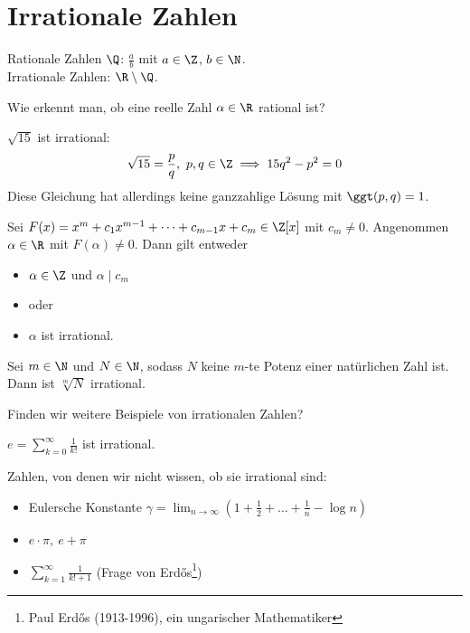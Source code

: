 \chapter{Irrationale Zahlen}

Rationale Zahlen $\Q$: $\frac{a}{b}$ mit $a \in \Z$, $b \in \N$.\\
Irrationale Zahlen: $\R \setminus \Q$.

\begin{frage*}
	Wie erkennt man, ob eine reelle Zahl $\alpha \in \R$ rational ist?
\end{frage*}

\begin{exmp*}
	$\sqrt{15}$ ist irrational:
	\[ \sqrt{15} = \frac{p}{q},\ p,q \in \Z \implies 15q^2 - p^2 = 0 \]
	Diese Gleichung hat allerdings keine ganzzahlige Lösung mit $\ggt(p,q)=1$.
\end{exmp*}

\begin{lem}\autolabel
	Sei $F(x) = x^m + c_1x^{m-1} + \dots + c_{m-1}x + c_m \in \Z[x]$ mit $c_m \neq 0$. Angenommen $\alpha \in \R$ mit $F(\alpha) \neq 0$. Dann gilt entweder
	\begin{itemize}
		\item $\alpha \in \Z$ und $\alpha \mid c_m$
		\item[] oder
		\item $\alpha$ ist irrational.
	\end{itemize}
\end{lem}

\begin{cor*}
	Sei $m \in \N$ und $N \in \N$, sodass $N$ keine $m$-te Potenz einer natürlichen Zahl ist. Dann ist $\sqrt[m]{N}$ irrational.
\end{cor*}

\begin{frage*}
	Finden wir weitere Beispiele von irrationalen Zahlen?
\end{frage*}

\begin{thm}\autolabel
	$e = \sum_{k=0}^{\infty} \frac{1}{k!}$ ist irrational.
\end{thm}

Zahlen, von denen wir nicht wissen, ob sie irrational sind:
\begin{itemize}
	\item Eulersche Konstante $\gamma = \lim_{n \to \infty} \left( 1 + \frac{1}{2} + \dots + \frac{1}{n} - \log n \right)$
	\item $e \cdot \pi,\ e + \pi$
	\item \( \sum_{k=1}^\infty \frac{1}{k!+1} \) (Frage von Erdős\footnote{Paul Erdős (1913-1996), ein ungarischer Mathematiker})
\end{itemize}

